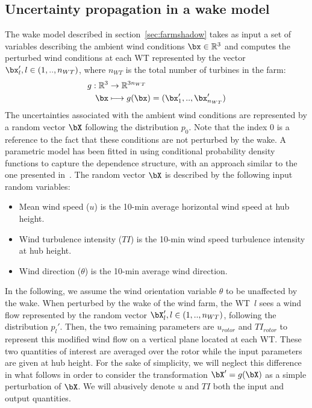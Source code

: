 \subsection{Uncertainty propagation in a wake model}
\label{sec:UQ-wake}
The wake model described in section~\ref{sec:farmshadow} takes as input a set of variables describing the ambient wind conditions $\bx \in \mathbb{R}^3$ and computes the perturbed wind conditions at each WT represented by the vector $\bx _l', l \in (1,..,n_{WT})$, where $n_{WT}$ is the total number of turbines in the farm:
\begin{align}
    g:\mathbb{R}^3 &\rightarrow \mathbb{R}^{3 n_{WT}} \\
    \bx &\longmapsto g(\bx) = (\bx_1',..,\bx_{n_{WT}}')
\end{align}
The uncertainties associated with the ambient wind conditions are represented by a random vector $\bX$ following the distribution $p_0$. 
Note that the index 0 is a reference to the fact that these conditions are not perturbed by the wake. 
A parametric model has been fitted in \cite{vanem_fekhari_2023} using conditional probability density functions to capture the dependence structure, with an approach similar to the one presented in~\cite{kelly_2022}. 
The random vector $\bX$ is described by the following input random variables:
\begin{itemize}
    \item Mean wind speed ($u$) is the 10-min average horizontal wind speed at hub height.
    \item Wind turbulence intensity ($TI$) is the 10-min wind speed turbulence intensity at hub height.
    \item Wind direction ($\theta$) is the 10-min average wind direction.
\end{itemize}
In the following, we assume the wind orientation variable $\theta$ to be unaffected by the wake. 
When perturbed by the wake of the wind farm, the WT~$l$ sees a wind flow represented by the random vector $\bX_l',l \in (1,..,n_{WT})$, following the distribution $p_l'$. 
Then, the two remaining parameters are $u_{rotor}$ and $TI_{rotor}$ to represent this modified wind flow on a vertical plane located at each WT. 
These two quantities of interest are averaged over the rotor while the input parameters are given at hub height. For the sake of simplicity, we will neglect this difference in what follows in order to consider the transformation $\bX'=g(\bX)$ as a simple perturbation of $\bX$. We will abusively denote $u$ and $TI$ both the input and output quantities. 
